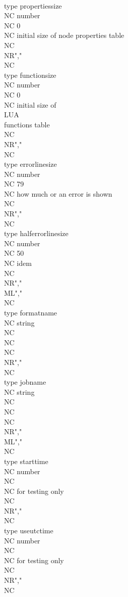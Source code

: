  \\type {propertiessize}    \\NC number       \\NC        0 \\NC initial size of node properties table \\NC \\NR","\\NC \\type {functionsize}      \\NC number       \\NC        0 \\NC initial size of \\LUA\\ functions table \\NC \\NR","\\NC \\type {errorlinesize}     \\NC number       \\NC       79 \\NC how much or an error is shown \\NC \\NR","\\NC \\type {halferrorlinesize} \\NC number       \\NC       50 \\NC idem \\NC \\NR","\\ML","\\NC \\type {formatname}        \\NC string       \\NC          \\NC \\NC \\NR","\\NC \\type {jobname}           \\NC string       \\NC          \\NC \\NC \\NR","\\ML","\\NC \\type {starttime}         \\NC number       \\NC          \\NC for testing only \\NC \\NR","\\NC \\type {useutctime}        \\NC number       \\NC          \\NC for testing only \\NC \\NR","\\NC \